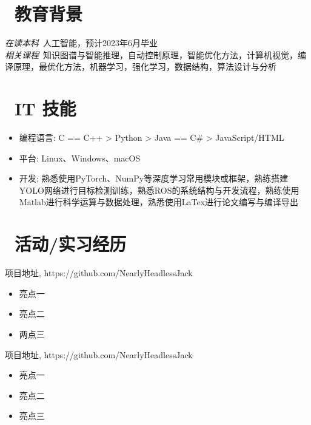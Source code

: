 \documentclass{resume}
\begin{document}

 
\section{\faGraduationCap\  教育背景}
\textit{在读本科}\ 人工智能，预计2023年6月毕业\\
\textit{相关课程}\  知识图谱与智能推理，自动控制原理，智能优化方法，计算机视觉，编译原理，最优化方法，机器学习，强化学习，数据结构，算法设计与分析

\section{\faCogs\ IT 技能}
\begin{itemize}[parsep=0.5ex]
  \item 编程语言: C == C++ > Python > Java == C\# > JavaScript/HTML
  \item 平台: Linux、Windows、macOS
  \item 开发: 熟悉使用PyTorch、NumPy等深度学习常用模块或框架，熟练搭建YOLO网络进行目标检测训练，熟悉ROS的系统结构与开发流程，熟练使用Matlab进行科学运算与数据处理，熟悉使用LaTex进行论文编写与编译导出
\end{itemize}

\section{\faUsers\ 活动/实习经历}
\begin{onehalfspacing}
项目地址, https://github.com/NearlyHeadlessJack
\begin{itemize}
  \item 亮点一
  \item 亮点二
  \item 两点三
\end{itemize}
\end{onehalfspacing}

\begin{onehalfspacing}
项目地址, https://github.com/NearlyHeadlessJack
\begin{itemize}
  \item 亮点一
  \item 亮点二
  \item 亮点三
\end{itemize}
\end{onehalfspacing}
\end{document}
